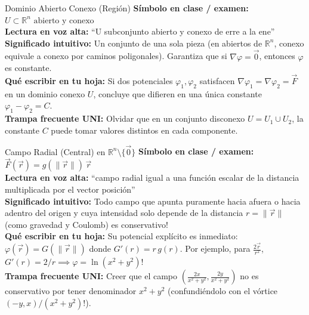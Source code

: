 \documentclass[11pt,a4paper]{article}
\begin{document}
\begin{definicionbox}{Dominio Abierto Conexo (Región)}
\textbf{Símbolo en clase / examen:} $U \subset \mathbb{R}^n \text{ abierto y conexo}$\\[0.15cm]
\textbf{Lectura en voz alta:} ``U subconjunto abierto y conexo de erre a la ene''\\[0.12cm]
\textbf{Significado intuitivo:} Un conjunto de una sola pieza (en abiertos de $\mathbb{R}^n$, conexo equivale a conexo por caminos poligonales). Garantiza que si $\nabla\varphi = \vec{0}$, entonces $\varphi$ es constante.\\[0.12cm]
\textbf{Qué escribir en tu hoja:} Si dos potenciales $\varphi_1, \varphi_2$ satisfacen $\nabla\varphi_1 = \nabla\varphi_2 = \vec{F}$ en un dominio conexo $U$, concluye que difieren en una única constante $\varphi_1 - \varphi_2 = C$.\\[0.12cm]
\textbf{Trampa frecuente UNI:} Olvidar que en un conjunto disconexo $U = U_1 \cup U_2$, la constante $C$ puede tomar valores distintos en cada componente.
\end{definicionbox}

\begin{definicionbox}{Campo Radial (Central) en $\mathbb{R}^n \setminus \{\vec{0}\}$}
\textbf{Símbolo en clase / examen:} $\vec{F}(\vec{r}) = g(\|\vec{r}\|)\,\vec{r}$\\[0.15cm]
\textbf{Lectura en voz alta:} ``campo radial igual a una función escalar de la distancia multiplicada por el vector posición''\\[0.12cm]
\textbf{Significado intuitivo:} Todo campo que apunta puramente hacia afuera o hacia adentro del origen y cuya intensidad solo depende de la distancia $r = \|\vec{r}\|$ (como gravedad y Coulomb) es conservativo!\\[0.12cm]
\textbf{Qué escribir en tu hoja:} Su potencial explícito es inmediato: $\varphi(\vec{r}) = G(\|\vec{r}\|)$ donde $G'(r) = r\,g(r)$. Por ejemplo, para $\frac{2\vec{r}}{r^2}$, $G'(r) = 2/r \implies \varphi = \ln(x^2+y^2)$!\\[0.12cm]
\textbf{Trampa frecuente UNI:} Creer que el campo $\left(\frac{2x}{x^2+y^2}, \frac{2y}{x^2+y^2}\right)$ no es conservativo por tener denominador $x^2+y^2$ (confundiéndolo con el vórtice $(-y,x)/(x^2+y^2)$!).
\end{definicionbox}
\end{document}

